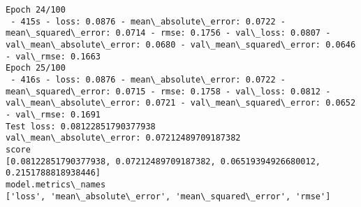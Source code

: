 \documentclass[11pt]{article}
\begin{document}
\begin{Verbatim}[commandchars=\\\{\}]
Epoch 24/100
 - 415s - loss: 0.0876 - mean\_absolute\_error: 0.0722 - mean\_squared\_error: 0.0714 - rmse: 0.1756 - val\_loss: 0.0807 - val\_mean\_absolute\_error: 0.0680 - val\_mean\_squared\_error: 0.0646 - val\_rmse: 0.1663
Epoch 25/100
 - 416s - loss: 0.0876 - mean\_absolute\_error: 0.0722 - mean\_squared\_error: 0.0715 - rmse: 0.1758 - val\_loss: 0.0812 - val\_mean\_absolute\_error: 0.0721 - val\_mean\_squared\_error: 0.0652 - val\_rmse: 0.1691
Test loss: 0.08122851790377938
val\_mean\_absolute\_error: 0.07212489709187382
score
[0.08122851790377938, 0.07212489709187382, 0.06519394926680012, 0.2151788818938446]
model.metrics\_names
['loss', 'mean\_absolute\_error', 'mean\_squared\_error', 'rmse']

    \end{Verbatim}


    
    
    
    
\end{document}

